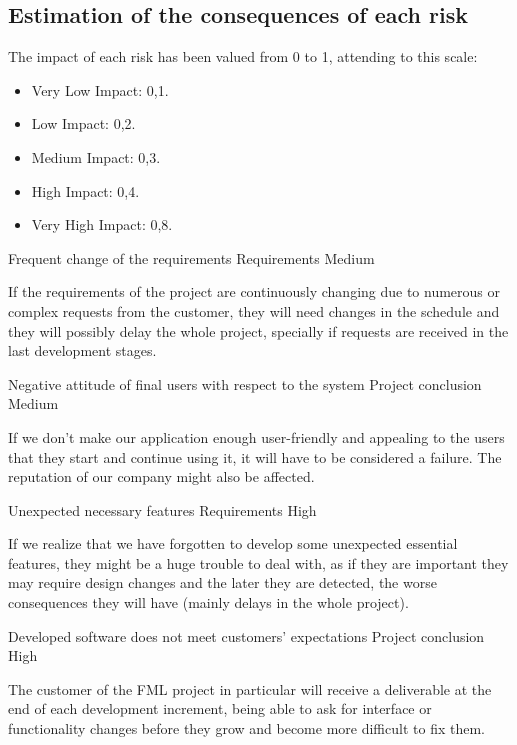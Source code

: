 \subsection{Estimation of the consequences of each risk}

The impact of each risk has been valued from 0 to 1, attending to this scale:
\begin{itemize}
\item Very Low Impact: 0,1.
\item Low Impact: 0,2.
\item Medium Impact: 0,3.
\item High Impact: 0,4.
\item Very High Impact: 0,8.
\end{itemize}

\begin{risk}[riskReqChange]{Frequent change of the requirements}
\riskcat Requirements
 Medium

If the requirements of the project are continuously changing due to numerous or complex requests from the customer, they will need changes in the schedule and they will possibly delay the whole project, specially if requests are received in the last development stages.
\end{risk}

\begin{risk}[riskAttitude]{Negative attitude of final users with respect to the system}
\riskcat Project conclusion
 Medium

If we don't make our application enough user-friendly and appealing to the users that they start and continue using it, it will have to be considered a failure. The reputation of our company might also be affected.
\end{risk}

\begin{risk}[riskFeaturesUnexpected]{Unexpected necessary features}
\riskcat Requirements
 High

If we realize that we have forgotten to develop some unexpected essential features, they might be a huge trouble to deal with, as if they are important they may require design changes and the later they are detected, the worse consequences they will have (mainly delays in the whole project).
\end{risk}

\begin{risk}[riskExpectations]{Developed software does not meet customers' expectations}
\riskcat Project conclusion
 High

The customer of the FML project in particular will receive a deliverable at the end of each development increment, being able to ask for interface or functionality changes before they grow and become more difficult to fix them.
\end{risk}

